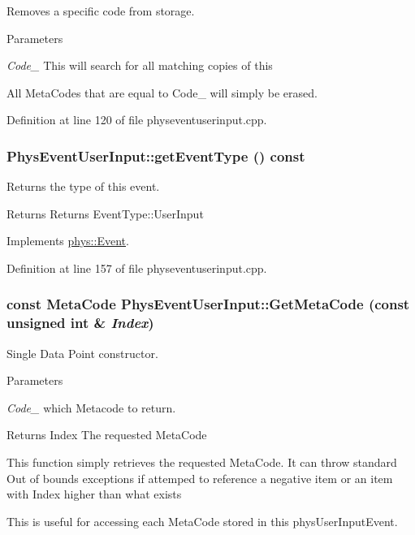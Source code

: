 Removes a specific code from storage. 
\begin{DoxyParams}{Parameters}
\item[{\em Code\_\-}]This will search for all matching copies of this\end{DoxyParams}
All MetaCodes that are equal to Code\_\- will simply be erased. 

Definition at line 120 of file physeventuserinput.cpp.\hypertarget{classPhysEventUserInput_a2a39643cd222f7af0db7b087e0441582}{
\subsubsection[{getEventType}]{ PhysEventUserInput::getEventType () const}}
\label{dc/d0e/classPhysEventUserInput_a2a39643cd222f7af0db7b087e0441582}


Returns the type of this event. \begin{DoxyReturn}{Returns}
Returns EventType::UserInput 
\end{DoxyReturn}


Implements \hyperlink{classphys_1_1Event_ac2c0623a6bc399e62f4b9fb2c022ea73}{phys::Event}.

Definition at line 157 of file physeventuserinput.cpp.\hypertarget{classPhysEventUserInput_aa564530c27f6983bb412e46c2c7ed086}{
\subsubsection[{GetMetaCode}]{\setlength{\rightskip}{0pt plus 5cm}const {\bf MetaCode} PhysEventUserInput::GetMetaCode (const unsigned int \& {\em Index})}}
\label{dc/d0e/classPhysEventUserInput_aa564530c27f6983bb412e46c2c7ed086}


Single Data Point constructor. 
\begin{DoxyParams}{Parameters}
\item[{\em Code\_\-}]which Metacode to return. \end{DoxyParams}
\begin{DoxyReturn}{Returns}
Index The requested MetaCode
\end{DoxyReturn}
This function simply retrieves the requested MetaCode. It can throw standard Out of bounds exceptions if attemped to reference a negative item or an item with Index higher than what exists \par
 This is useful for accessing each MetaCode stored in this physUserInputEvent. 

